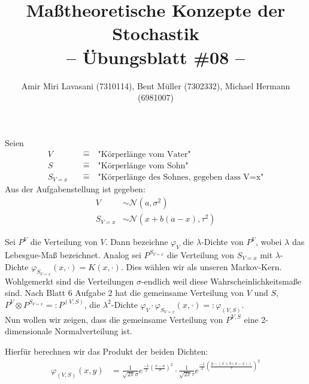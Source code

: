 \documentclass[10pt]{article}
\newcommand{\normal}{\mathcal{N}}
\newenvironment{Aufgabe}[2][Aufgabe]{\begin{trivlist}
\item[\hskip \labelsep {\bfseries #1}\hskip \labelsep {\bfseries #2.}]}{\end{trivlist}}
\begin{document}
 
\title{ \textbf{Maßtheoretische Konzepte der Stochastik \\ -- Übungsblatt \#08 --} }

\author{Amir Miri Lavasani (7310114), Bent Müller (7302332),
        Michael Hermann (6981007)}
\maketitle

\begin{Aufgabe}{1} %
\end{Aufgabe}

Seien 
\begin{align*}
	V \quad&\hat{=}\quad \text{"Körperlänge vom Vater"} \\
	S \quad&\hat{=}\quad \text{"Körperlänge vom Sohn"} \\
	S_{V=x} \quad&\hat{=}\quad \text{"Körperlänge des Sohnes, gegeben dass V=x"}
\end{align*} 
Aus der Aufgabenstellung ist gegeben:
\begin{align*}
	V &\sim \normal(a,\sigma^2) \\
	S_{V=x} &\sim \normal(x+b(a-x),\tau^2)
\end{align*}

Sei $P^V$ die Verteilung von $V$. Dann bezeichne $\varphi_V$ die $\lambda$-Dichte von $P^V$, wobei 
$\lambda$ das Lebesgue-Maß bezeichnet. Analog sei $P^{S_{V=x}}$ die Verteilung von $S_{V=x}$ mit 
$\lambda$-Dichte $\varphi_{S_{V=x}}(x, \cdot) = K(x, \cdot)$. Dies wählen wir als unseren Markov-Kern.
Wohlgemerkt sind die Verteilungen $\sigma$-endlich weil diese Wahrscheinlichkeitsmaße sind.
Nach Blatt 6 Aufgabe 2 hat die gemeinsame Verteilung von 
$V$ und $S$, $P^V \otimes P^{S_{V=x}} =: P^{(V,S)}$, die $\lambda^2$-Dichte $\varphi_V \cdot 
\varphi_{S_{V=x}}(x, \cdot) =: \varphi_{(V,S)}$. \\


Nun wollen wir zeigen, dass die gemeinsame Verteilung von $P ^{V, S}$ eine 2-dimensionale Normalverteilung ist.

Hierfür berechnen wir das Produkt der beiden Dichten:
\begin{align*}
	\varphi_{\left(
		V, S
\right) } (x, y) &= 
\frac{ 1 }{ \sqrt{2 \pi} \sigma } e ^{\frac{ -1 }{ 2 } \left(
		\frac{ x-a }{ \sigma }
\right) ^2 } \cdot
\frac{ 1 }{ \sqrt{2 \pi} \tau } e ^{\frac{ -1 }{ 2 } \left(
		\frac{ y - (x + b(a-x)) }{ \tau }
\right) ^2 }
\end{align*}
\end{document}
